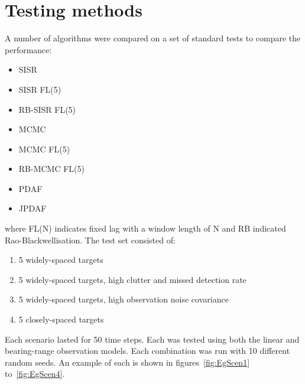\section{Testing methods}
A number of algorithms were compared on a set of standard tests to compare the performance:

\begin{itemize}
	\item SISR
	\item SISR FL(5)
	\item RB-SISR FL(5)
	\item MCMC
	\item MCMC FL(5)
	\item RB-MCMC FL(5)
	\item PDAF
	\item JPDAF
\end{itemize}

where FL(N) indicates fixed lag with a window length of N and RB indicated Rao-Blackwellisation. The test set consisted of:

\begin{enumerate}
	\item 5 widely-spaced targets
	\item 5 widely-spaced targets, high clutter and missed detection rate
	\item 5 widely-spaced targets, high observation noise covariance
	\item 5 closely-spaced targets
\end{enumerate}

Each scenario lasted for 50 time steps. Each was tested using both the linear and bearing-range observation models. Each combination was run with 10 different random seeds. An example of each is shown in figures~\ref{fig:EgScen1} to~\ref{fig:EgScen4}.

